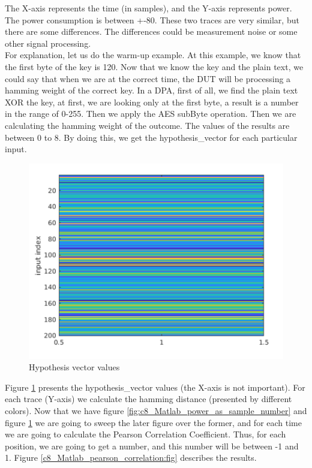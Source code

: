 The X-axis represents the time (in samples), and the Y-axis represents power.
The power consumption is between +-80. These two traces are very similar, but
there are some differences. The differences could be measurement noise or some
other signal processing.\\
For explanation, let us do the warm-up example. At this example, we know that the
first byte of the key is 120. Now that we know the key and the plain text, we
could say that when we are at the correct time, the DUT will be processing
a hamming weight of the correct key. In a DPA, first of all, we find the plain
text XOR the key, at first, we are looking only at the first byte, a result is
a number in the range of 0-255. Then we apply the AES subByte operation. Then we
are calculating the hamming weight of the outcome. The values of the results are
between 0 to 8. By doing this, we get the hypothesis\_vector for each particular
input.

\begin{figure}[!ht]
    \centering
    \includegraphics[width=1.0\textwidth]{images/chapter8/hypothesis_vector_values.png}
    \caption{Hypothesis vector values} \label{c8_Matlab_hypothesis_vector_values:fig}
\end{figure}


Figure \ref{c8_Matlab_hypothesis_vector_values:fig} presents the
hypothesis\_vector values (the X-axis is not important). For each trace (Y-axis)
we calculate the hamming distance (presented by different colors). Now that we
have figure \ref{fig:c8_Matlab_power_as_sample_number} and figure
\ref{c8_Matlab_hypothesis_vector_values:fig} we are going to sweep the later
figure over the former, and for  each time we are going to calculate the Pearson
Correlation Coefficient. Thus, for each position, we are going to get a number,
and this number will be between -1 and 1. Figure
\ref{c8_Matlab_pearson_correlation:fig} describes the results.

